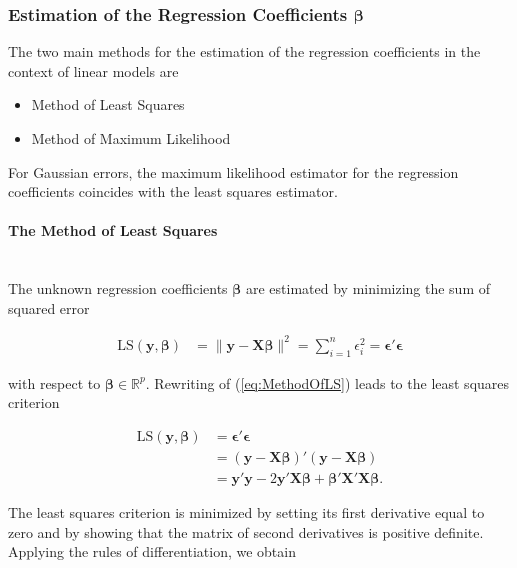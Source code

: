 \documentclass[10pt,a4paper]{article}
\newcommand{\subsubsubsection}[1]{\paragraph{#1}\mbox{}\\}
\begin{document}
\subsubsection{Estimation of the Regression Coefficients $\boldsymbol{\beta}$}

The two main methods for the estimation of the regression coefficients in the context of linear models are

\begin{itemize}
	\item Method of Least Squares
	\item Method of Maximum Likelihood
\end{itemize}	

For Gaussian errors, the maximum likelihood estimator for the regression coefficients coincides with the least squares estimator. 

\subsubsubsection{The Method of Least Squares}

The unknown regression coefficients $\boldsymbol{\beta}$ are estimated by minimizing the sum of squared error

\begin{align} \label{eq:MethodOfLS} 
	\text{LS}(\boldsymbol{y}, \boldsymbol{\beta}) &=  \lVert \boldsymbol{y} - \boldsymbol{X} \boldsymbol{\beta} \rVert^2 = \sum_{i=1}^n\epsilon_i^2 = \boldsymbol{\epsilon}'\boldsymbol{\epsilon}
\end{align}

with respect to $\boldsymbol{\beta} \in \mathbb{R}^p$. \cite{friedman2001elements} Rewriting of (\ref{eq:MethodOfLS}) leads to the least squares criterion

\begin{align} \label{eq:LS_derivation}
	\text{LS}(\boldsymbol{y}, \boldsymbol{\beta}) &= \boldsymbol{\epsilon}'\boldsymbol{\epsilon} \\
								 				  &= (\boldsymbol{y} - \boldsymbol{X} \boldsymbol{\beta})'(\boldsymbol{y} - \boldsymbol{X} \boldsymbol{\beta}) \\ 
				 								  &= \boldsymbol{y}'\boldsymbol{y} - 2\boldsymbol{y}'\boldsymbol{X} \boldsymbol{\beta} + \boldsymbol{\beta}' \boldsymbol{X}'\boldsymbol{X} \boldsymbol{\beta}.
\end{align}

The least squares criterion is minimized by setting its first derivative equal to zero and by showing that the matrix of second derivatives is positive definite. Applying the rules of differentiation, we obtain
\end{document}
